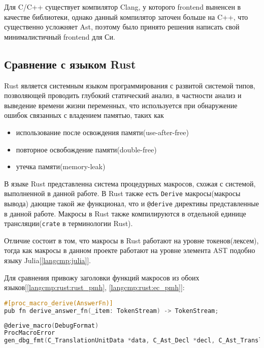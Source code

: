 Для C/C++ существует компилятор Clang, у которого frontend выненсен в качестве библиотеки, однако данный компилятор заточен больше на C++, что существенно усложняет Ast, 
поэтому было принято решения написать свой минималистичный frontend для Си.



\subsection{Сравнение с языком Rust}
Rust является системным языком программирования с развитой системой типов, позволяющей проводить глубокий статический анализ, в частности анализ и выведение времени жизни переменных, 
что используется при обнаружение ошибок связанных с владением памятью, таких как
\begin{itemize}
\item использование после освождения памяти(use-after-free)
\item повторное освобождение памяти(double-free) 
\item утечка памяти(memory-leak)
\end{itemize}


В языке Rust представленна система\cite{rust-proc-macro} процедурных макросов, схожая с системой, выполненной в данной работе.
В Rust также есть \verb|Derive| макросы(макросы вывода) дающие такой же функционал, что и \verb|@derive| директивы представленные в данной работе.
Макросы в Rust также компилируются в отдельной единице трансляции(\verb|crate| в терминологии Rust).

Отличие состоит в том, что макросы в Rust работают на уровне токенов(лексем), тогда как макросы в данном проекте работают на уровне элемента AST подобно языку Julia[\ref{langcmp:julia}].

Для сравнения привожу заголовки функций макросов из обоих языков[\ref{langcmp:rust:rust_pmh}, \ref{langcmp:rust:ec_pmh}]:


\begin{lstlisting}[language=C, caption={Заголовок процедурного макроса Rust}, label={langcmp:rust:rust_pmh}]
#[proc_macro_derive(AnswerFn)]
pub fn derive_answer_fn(_item: TokenStream) -> TokenStream;
\end{lstlisting}

\begin{lstlisting}[language=C, caption={Заголовок процедурного макроса EC}, label={langcmp:rust:ec_pmh}]
@derive_macro(DebugFormat)
ProcMacroError
gen_dbg_fmt(C_TranslationUnitData *data, C_Ast_Decl *decl, C_Ast_TranslationUnit **out_node);
\end{lstlisting}

